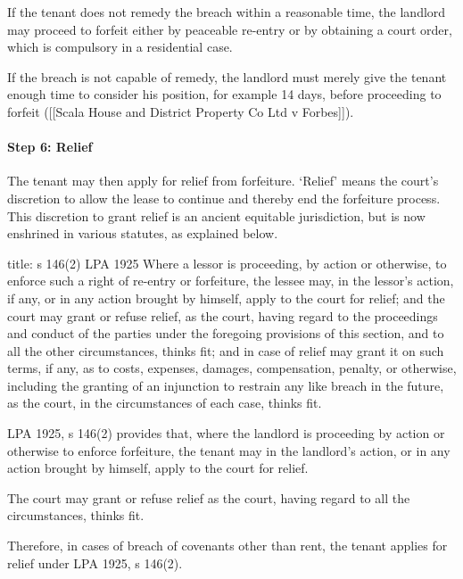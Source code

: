 \documentclass[
]{article}
\newenvironment{Shaded}{}{}
\newcommand{\NormalTok}[1]{#1}
\begin{document}
If the tenant does not remedy the breach within a reasonable time, the
landlord may proceed to forfeit either by peaceable re-entry or by
obtaining a court order, which is compulsory in a residential case.

If the breach is not capable of remedy, the landlord must merely give
the tenant enough time to consider his position, for example 14 days,
before proceeding to forfeit ({[}{[}Scala House and District Property Co
Ltd v Forbes{]}{]}).

\hypertarget{step-6-relief}{%
\paragraph{Step 6: Relief}\label{step-6-relief}}

The tenant may then apply for relief from forfeiture. `Relief' means the
court's discretion to allow the lease to continue and thereby end the
forfeiture process. This discretion to grant relief is an ancient
equitable jurisdiction, but is now enshrined in various statutes, as
explained below.

\begin{Shaded}
\begin{Highlighting}[]
\NormalTok{title: s 146(2) LPA 1925}
\NormalTok{Where a lessor is proceeding, by action or otherwise, to enforce such a right of re{-}entry or forfeiture, the lessee may, in the lessor’s action, if any, or in any action brought by himself, apply to the court for relief; and the court may grant or refuse relief, as the court, having regard to the proceedings and conduct of the parties under the foregoing provisions of this section, and to all the other circumstances, thinks fit; and in case of relief may grant it on such terms, if any, as to costs, expenses, damages, compensation, penalty, or otherwise, including the granting of an injunction to restrain any like breach in the future, as the court, in the circumstances of each case, thinks fit.}
\end{Highlighting}
\end{Shaded}

LPA 1925, s 146(2) provides that, where the landlord is proceeding by
action or otherwise to enforce forfeiture, the tenant may in the
landlord's action, or in any action brought by himself, apply to the
court for relief.

The court may grant or refuse relief as the court, having regard to all
the circumstances, thinks fit.

Therefore, in cases of breach of covenants other than rent, the tenant
applies for relief under LPA 1925, s 146(2).
\end{document}

